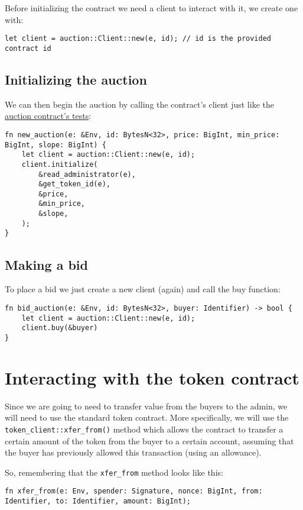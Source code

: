 \documentclass[10pt]{article}
\begin{document}
Before initializing the contract we need a client to interact with it, we create one with:

\begin{verbatim}
let client = auction::Client::new(e, id); // id is the provided contract id
\end{verbatim}

\subsection*{Initializing the auction}
We can then begin the auction by calling the contract's client just like the \href{https://github.com/Xycloo/soroban-dutch-auction-contract/blob/main/src/test.rs#L59}{auction contract's tests}:

\begin{verbatim}
fn new_auction(e: &Env, id: BytesN<32>, price: BigInt, min_price: BigInt, slope: BigInt) {
    let client = auction::Client::new(e, id);
    client.initialize(
        &read_administrator(e),
        &get_token_id(e),
        &price,
        &min_price,
        &slope,
    );
}
\end{verbatim}

\subsection*{Making a bid}
To place a bid we just create a new client (again) and call the buy function:

\begin{verbatim}
fn bid_auction(e: &Env, id: BytesN<32>, buyer: Identifier) -> bool {
    let client = auction::Client::new(e, id);
    client.buy(&buyer)
}
\end{verbatim}

\section*{Interacting with the token contract}
Since we are going to need to transfer value from the buyers to the admin, we will need to use the standard token contract. More specifically, we will use the \texttt{token\_client::xfer\_from()} method which allows the contract to transfer a certain amount of the token from the buyer to a certain account, assuming that the buyer has previously allowed this transaction (using an allowance).

So, remembering that the \texttt{xfer\_from} method looks like this:

\begin{verbatim}
fn xfer_from(e: Env, spender: Signature, nonce: BigInt, from: Identifier, to: Identifier, amount: BigInt);
\end{verbatim}
\end{document}
